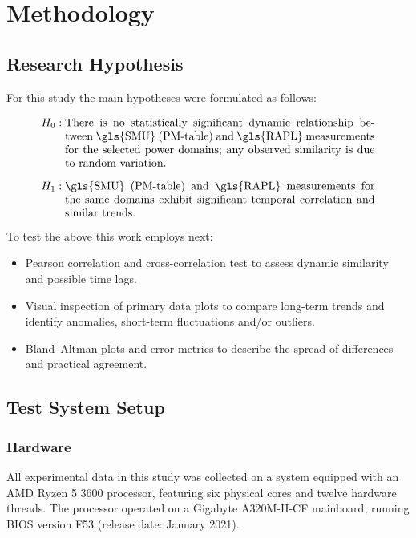 \section{Methodology}

\subsection{Research Hypothesis}
\label{sec:hypo}

For this study the main hypotheses were formulated as follows:

\begin{align*}
H_{0}&: 
\begin{minipage}[t]{0.8\linewidth}
There is no statistically significant dynamic relationship between
\gls{SMU} (PM-table) and \gls{RAPL} measurements for the
selected power domains; any observed similarity
is due to random variation.
\end{minipage}\\[0.8em]
H_{1}&:
\begin{minipage}[t]{0.8\linewidth}
\gls{SMU} (PM-table) and \gls{RAPL} measurements for the same domains
exhibit significant temporal correlation and similar trends.
\end{minipage}
\end{align*}

To test the above this work employs next:
\begin{itemize}
  \item Pearson correlation and cross-correlation test to assess dynamic
        similarity and possible time lags.
  \item Visual inspection of primary data plots to compare long-term trends
        and identify anomalies, short-term fluctuations and/or outliers.
  \item Bland–Altman plots and error metrics to describe the spread of
        differences and practical agreement.
\end{itemize}

\subsection{Test System Setup}

\subsubsection{Hardware}

All experimental data in this study was collected on a system equipped with an
AMD Ryzen 5 3600 processor, featuring six physical cores and twelve hardware
threads. The processor operated on a Gigabyte A320M-H-CF mainboard, running
\gls{BIOS} version F53 (release date: January 2021).  

